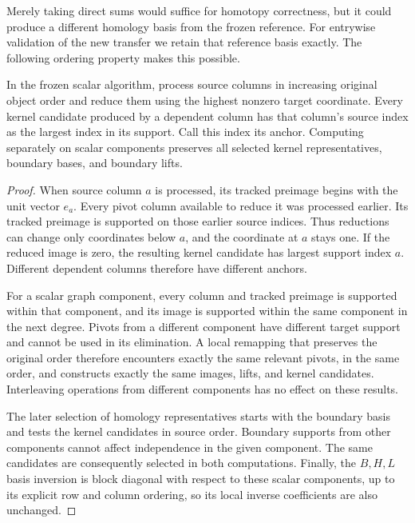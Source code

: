 Merely taking direct sums would suffice for homotopy correctness, but it
could produce a different homology basis from the frozen reference.  For
entrywise validation of the new transfer we retain that reference basis
exactly.  The following ordering property makes this possible.

\begin{lemma}
\label{lem:scalar-kernel-anchors}
In the frozen scalar algorithm, process source columns in increasing
original object order and reduce them using the highest nonzero target
coordinate.  Every kernel candidate produced by a dependent column has
that column's source index as the largest index in its support.  Call this
index its anchor.  Computing separately on scalar components preserves all
selected kernel representatives, boundary bases, and boundary lifts.
\end{lemma}

\begin{proof}
When source column $a$ is processed, its tracked preimage begins with the
unit vector $e_a$.  Every pivot column available to reduce it was processed
earlier.  Its tracked preimage is supported on those earlier source indices.
Thus reductions can change only coordinates below $a$, and the coordinate
at $a$ stays one.  If the reduced image is zero, the resulting kernel
candidate has largest support index $a$.  Different dependent columns
therefore have different anchors.

For a scalar graph component, every column and tracked preimage is supported
within that component, and its image is supported within the same component
in the next degree.  Pivots from a different component have different target
support and cannot be used in its elimination.  A local remapping that
preserves the original order therefore encounters exactly the same relevant
pivots, in the same order, and constructs exactly the same images, lifts,
and kernel candidates.  Interleaving operations from different components
has no effect on these results.

The later selection of homology representatives starts with the boundary
basis and tests the kernel candidates in source order.  Boundary supports
from other components cannot affect independence in the given component.
The same candidates are consequently selected in both computations.  Finally,
the $B,H,L$ basis inversion is block diagonal with respect to these scalar
components, up to its explicit row and column ordering, so its local inverse
coefficients are also unchanged.
\end{proof}

